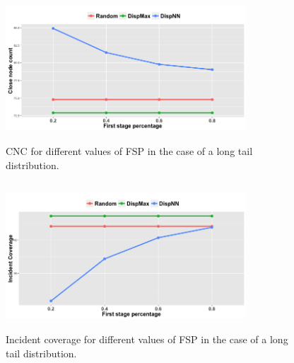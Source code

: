 \documentclass{acm_proc_article-sp}
\begin{document}
\begin{figure}[!tb]
\centering
\includegraphics[width=9cm ,height=5.5cm]{figuresPng/LT-closePeople.png}
\caption{CNC for different values of FSP in the case of a long tail distribution. }
\label{fig:LTClosePeople}
\end{figure}
\begin{figure}[!h]
\centering
\includegraphics[width=9cm ,height=5.5cm]{figuresPng/LT-incidCov.png}
\caption{Incident coverage for different values of FSP in the case of a long tail distribution. }
\label{fig:LTIncdCove}
\end{figure}
\end{document}
